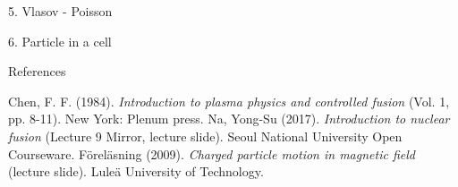 \documentclass{beamer}
\begin{document}
	\begin{frame}[t]{5. Vlasov - Poisson}
		
	\end{frame}

	\begin{frame}[t]{6. Particle in a cell}
		
	\end{frame}

	\begin{frame}[t]{References}
		\begin{thebibliography}{}
			Chen, F. F. (1984). \textit{Introduction to plasma physics and controlled fusion} (Vol. 1, pp. 8-11). New York: Plenum press.
			Na, Yong-Su (2017). \textit{Introduction to nuclear fusion} (Lecture 9 Mirror, lecture slide). Seoul National University Open Courseware.
			F\"{o}rel\"{a}sning (2009). \textit{Charged particle motion in magnetic field} (lecture slide). Lule\"{a} University of Technology.
			
		\end{thebibliography}
	\end{frame}
\end{document}

